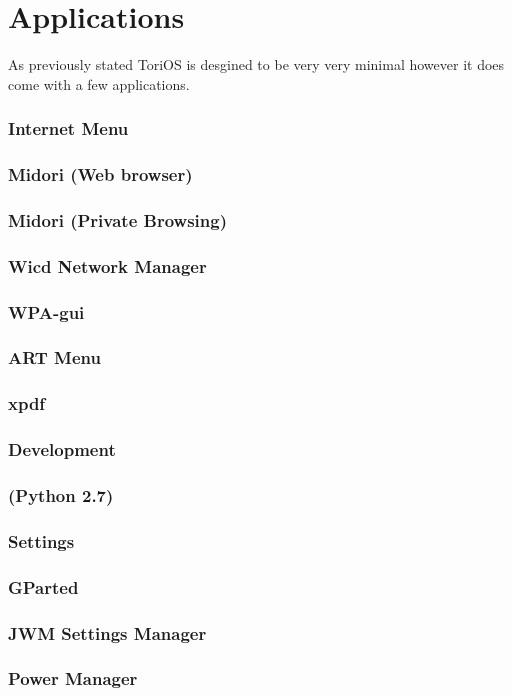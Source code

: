 \documentclass[12pt,a4paper]{book}
\begin{document}
\chapter{Applications}
As previously stated ToriOS is desgined to be very very minimal however it does come with a few applications. 
\subsection{Internet Menu}
\subsection{Midori (Web browser)}
\subsection{Midori (Private Browsing)}
\subsection{Wicd Network Manager}
\subsection{WPA-gui}
\subsection{ART Menu}
\subsection{xpdf}
\subsection{Development}
\subsection{(Python 2.7)}

\subsection{Settings}
\subsection{GParted}
\subsection{JWM Settings Manager}
\subsection{Power Manager}
\end{document}
